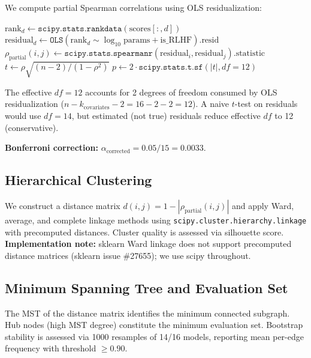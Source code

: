 We compute partial Spearman correlations using OLS residualization:

\begin{algorithm}[h]
\caption{Partial Spearman via OLS Residualization}
\label{alg:partial_spearman}
\begin{algorithmic}[1]
  \STATE $\text{rank}_d \leftarrow \texttt{scipy.stats.rankdata}(\text{scores}[:, d])$
  \STATE $\text{residual}_d \leftarrow \texttt{OLS}(\text{rank}_d \sim \log_{10}\text{params} + \text{is\_RLHF}).\text{resid}$
\ENDFOR
{}
  \STATE $\rho_\text{partial}(i,j) \leftarrow \texttt{scipy.stats.spearmanr}(\text{residual}_i, \text{residual}_j).\text{statistic}$
  \STATE $t \leftarrow \rho \sqrt{(n-2)/(1-\rho^2)}$
  \STATE $p \leftarrow 2 \cdot \texttt{scipy.stats.t.sf}(|t|, df=12)$
\ENDFOR
\end{algorithmic}
\end{algorithm}

The effective $df = 12$ accounts for 2 degrees of freedom consumed by OLS residualization ($n - k_\text{covariates} - 2 = 16 - 2 - 2 = 12$). A naive $t$-test on residuals would use $df=14$, but estimated (not true) residuals reduce effective $df$ to 12 (conservative).

\textbf{Bonferroni correction:} $\alpha_\text{corrected} = 0.05/15 = 0.0033$.

\subsection{Hierarchical Clustering}

We construct a distance matrix $d(i, j) = 1 - |\rho_\text{partial}(i, j)|$ and apply Ward, average, and complete linkage methods using \texttt{scipy.cluster.hierarchy.linkage} with precomputed distances. Cluster quality is assessed via silhouette score. \textbf{Implementation note:} sklearn Ward linkage does not support precomputed distance matrices (sklearn issue \#27655); we use scipy throughout.

\subsection{Minimum Spanning Tree and Evaluation Set}

The MST of the distance matrix identifies the minimum connected subgraph. Hub nodes (high MST degree) constitute the minimum evaluation set. Bootstrap stability is assessed via 1000 resamples of 14/16 models, reporting mean per-edge frequency \cite{tumminello2005tool} with threshold $\geq 0.90$.

